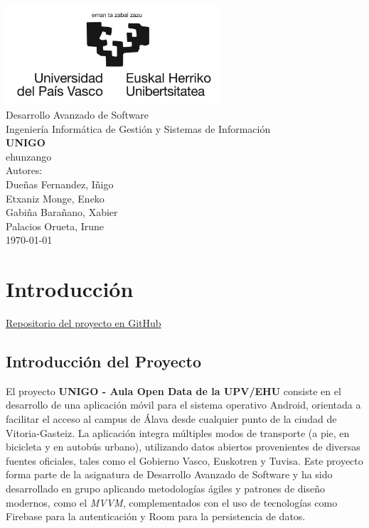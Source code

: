 \documentclass[a4paper,12pt]{report}
\begin{document}
  \begin{titlepage}
    \centering
    \includegraphics[width=0.6\textwidth]{../.img/ehuLogoLargo.jpg}\\
    \vspace{1cm}
    \LARGE Desarrollo Avanzado de Software\\
    \vspace{0.5cm}
    \Large Ingeniería Informática de Gestión y Sistemas de Información\\
    \vspace{3cm}
    \vspace{0.5cm}
    \Huge \textbf{UNIGO}\\
    \huge ehunzango\\
    \vspace{2.5cm}
    \Large Autores:\\
    \vspace{0.2cm}
    \large Dueñas Fernandez, Iñigo\\
    \large Etxaniz Monge, Eneko\\
    \large Gabiña Barañano, Xabier\\
    \large Palacios Orueta, Irune\\
    \vfill
    \today
  \end{titlepage}
  \chapter{Introducción}
    \begin{center}
      \href{https://github.com/Xabierland/UNIGO}{Repositorio del proyecto en GitHub}
    \end{center}
    \section{Introducción del Proyecto}
      El proyecto \textbf{UNIGO - Aula Open Data de la UPV/EHU} consiste en el desarrollo de una aplicación móvil para el sistema operativo Android, orientada a facilitar el acceso al campus de Álava desde cualquier punto de la ciudad de Vitoria-Gasteiz. La aplicación integra múltiples modos de transporte (a pie, en bicicleta y en autobús urbano), utilizando datos abiertos provenientes de diversas fuentes oficiales, tales como el Gobierno Vasco, Euskotren y Tuvisa. Este proyecto forma parte de la asignatura de Desarrollo Avanzado de Software y ha sido desarrollado en grupo aplicando metodologías ágiles y patrones de diseño modernos, como el \textit{MVVM}, complementados con el uso de tecnologías como Firebase para la autenticación y Room para la persistencia de datos.
\end{document}
